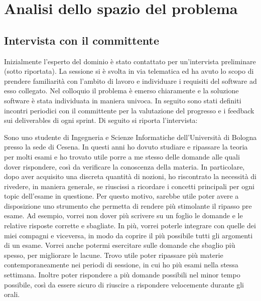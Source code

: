 \chapter{Analisi dello spazio del problema}

	\section{Intervista con il committente}
    Inizialmente l'esperto del dominio è stato contattato per un'intervista preliminare (sotto riportata).
    La sessione si è svolta in via telematica ed ha avuto lo scopo di prendere familiarità con l'ambito di lavoro e individuare i requisiti del software ad esso collegato. 
    Nel colloquio il problema è emerso chiaramente e la soluzione software è stata individuata in maniera univoca.
    In seguito sono stati definiti incontri periodici con il committente per la valutazione del progresso e i feedback sui deliverables di ogni sprint.
    Di seguito si riporta l'intervista:
    
    
    Sono uno studente di Ingegneria e Scienze Informatiche dell'Università di Bologna presso la sede di Cesena. In questi anni ho dovuto studiare e ripassare la teoria per molti esami e ho trovato utile porre a me stesso delle domande alle quali dover rispondere, così da verificare la conoscenza della materia.
    In particolare, dopo aver acquisito una discreta quantità di nozioni, ho riscontrato la necessità di rivedere, in maniera generale, se riuscissi a ricordare i concetti principali per ogni topic dell'esame in questione.
    Per questo motivo, sarebbe utile poter avere a disposizione uno strumento che permetta di rendere più stimolante il ripasso pre esame. Ad esempio, vorrei non dover più scrivere su un foglio le domande e le relative risposte corrette e sbagliate. In più, vorrei poterle integrare con quelle dei miei compagni e viceversa, in modo da coprire il più possibile tutti gli argomenti di un esame. Vorrei anche potermi esercitare sulle domande che sbaglio più spesso, per migliorare le lacune. Trovo utile poter ripassare più materie contemporaneamente nei periodi di sessione, in cui ho più esami nella stessa settimana. Inoltre poter rispondere a più domande possibili nel minor tempo possibile, così da essere sicuro di riuscire a rispondere velocemente durante gli orali.
    
